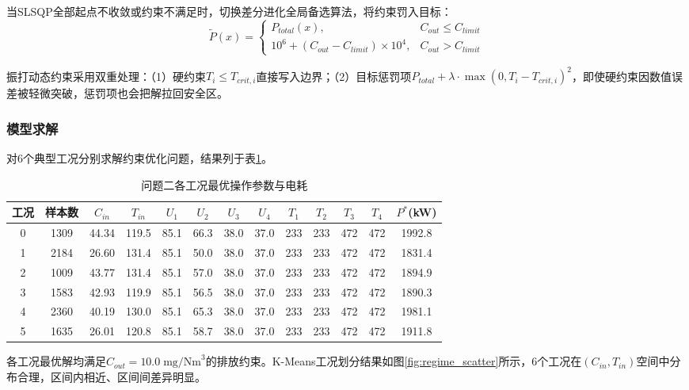 当SLSQP全部起点不收敛或约束不满足时，切换差分进化全局备选算法，将约束罚入目标：
\begin{equation}
    \tilde{P}(x) = \begin{cases} P_{total}(x), & C_{out} \leq C_{limit} \\ 10^6 + (C_{out} - C_{limit})\times 10^4, & C_{out} > C_{limit} \end{cases}
\end{equation}

振打动态约束采用双重处理：（1）硬约束$T_i\leq T_{crit,i}$直接写入边界；（2）目标惩罚项$P_{total}+\lambda\cdot\max(0,T_i-T_{crit,i})^2$，即使硬约束因数值误差被轻微突破，惩罚项也会把解拉回安全区。

\subsubsection{模型求解}

对6个典型工况分别求解约束优化问题，结果列于表\ref{tab:q2_results}。

\begin{table}[H]
  \centering
  \caption{问题二各工况最优操作参数与电耗}
  \label{tab:q2_results}
  \renewcommand{\arraystretch}{1.1}
  \begin{tabular}{ccccccccccccc}
    \toprule
    工况 & 样本数 & $C_{in}$ & $T_{in}$ & $U_1$ & $U_2$ & $U_3$ & $U_4$ & $T_1$ & $T_2$ & $T_3$ & $T_4$ & $P^*$(kW) \\
    \midrule
    0 & 1309 & 44.34 & 119.5 & 85.1 & 66.3 & 38.0 & 37.0 & 233 & 233 & 472 & 472 & 1992.8 \\
    1 & 2184 & 26.60 & 131.4 & 85.1 & 50.0 & 38.0 & 37.0 & 233 & 233 & 472 & 472 & 1831.4 \\
    2 & 1009 & 43.77 & 131.4 & 85.1 & 57.0 & 38.0 & 37.0 & 233 & 233 & 472 & 472 & 1894.9 \\
    3 & 1583 & 42.93 & 119.9 & 85.1 & 56.5 & 38.0 & 37.0 & 233 & 233 & 472 & 472 & 1890.3 \\
    4 & 2360 & 40.19 & 130.0 & 85.1 & 65.3 & 38.0 & 37.0 & 233 & 233 & 472 & 472 & 1981.1 \\
    5 & 1635 & 26.01 & 120.8 & 85.1 & 58.7 & 38.0 & 37.0 & 233 & 233 & 472 & 472 & 1911.8 \\
    \bottomrule
  \end{tabular}
\end{table}

各工况最优解均满足$C_{out}=10.0\;\text{mg/Nm}^3$的排放约束。K-Means工况划分结果如图\ref{fig:regime_scatter}所示，6个工况在$(C_{in},T_{in})$空间中分布合理，区间内相近、区间间差异明显。

